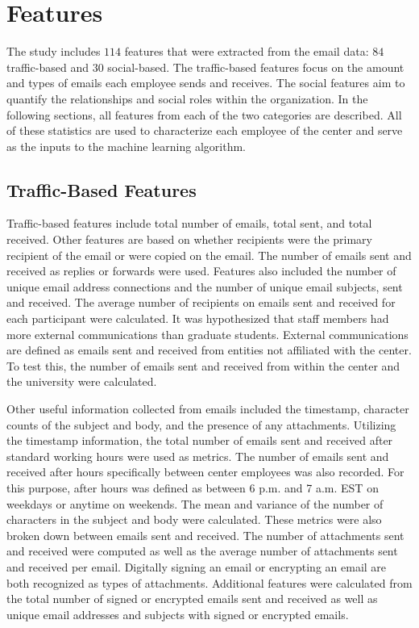 \documentclass[10pt,twocolumn,conference]{IEEEtran}
\begin{document}
\section{Features} \label{Features}
The study includes $114$ features that were extracted from the email data: $84$ traffic-based and $30$ social-based.
The traffic-based features focus on the amount and types of emails each employee sends and receives.
The social features aim to quantify the relationships and social roles within the organization.
In the following sections, all features from each of the two categories are described. 
All of these statistics are used to characterize each employee of the center and serve as the inputs to the machine learning algorithm.

\subsection{Traffic-Based Features}
Traffic-based features include total number of emails, total sent, and total received.
Other features are based on whether recipients were the primary recipient of the email or were copied on the email.
The number of emails sent and received as replies or forwards were used.
Features also included the number of unique email address connections and the number of unique email subjects, sent and received.
The average number of recipients on emails sent and received for each participant were calculated.
It was hypothesized that staff members had more external communications than graduate students.
External communications are defined as emails sent and received from entities not affiliated with the center.
To test this, the number of emails sent and received from within the center and the university were calculated.  

Other useful information collected from emails included the timestamp, character counts of the subject and body, and the presence of any attachments.
Utilizing the timestamp information, the total number of emails sent and received after standard working hours were used as metrics.
The number of emails sent and received after hours specifically between center employees was also recorded.
For this purpose, after hours was defined as between 6 p.m. and 7 a.m. EST on weekdays or anytime on weekends.
The mean and variance of the number of characters in the subject and body were calculated.
These metrics were also broken down between emails sent and received.
The number of attachments sent and received were computed as well as the average number of attachments sent and received per email.
Digitally signing an email or encrypting an email are both recognized as types of attachments.
Additional features were calculated from the total number of signed or encrypted emails sent and received as well as unique email addresses and subjects with signed or encrypted emails.
\end{document}

